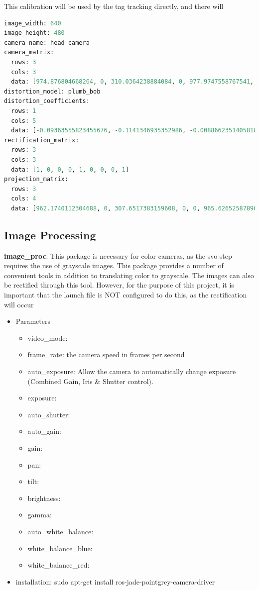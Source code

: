 \begin{itemize}
\begin{enumerate}
This calibration will be used by the tag tracking directly, and there will 
\begin{lstlisting}[language=python] 
image_width: 640
image_height: 480
camera_name: head_camera
camera_matrix:
  rows: 3
  cols: 3
  data: [974.876804668264, 0, 310.0364238884084, 0, 977.9747558767541, 183.9139863795955, 0, 0, 1]
distortion_model: plumb_bob
distortion_coefficients:
  rows: 1
  cols: 5
  data: [-0.09363555823455676, -0.1141346935352986, -0.008866235140581833, -0.0048644735641969, 0]
rectification_matrix:
  rows: 3
  cols: 3
  data: [1, 0, 0, 0, 1, 0, 0, 0, 1]
projection_matrix:
  rows: 3
  cols: 4
  data: [962.1740112304688, 0, 307.6517383159608, 0, 0, 965.6265258789062, 181.2353823390822, 0, 0, 0, 1, 0]
\end{lstlisting}
\end{enumerate}
\end{itemize}

\subsection{Image Processing}
\noindent \textbf{image\_proc}: This package is necessary for color cameras, as the svo step requires the use of grayscale images. This package provides a number of convenient tools in addition to translating color to grayscale. The images can also be rectified through this tool. However, for the purpose of this project, it is important that the launch file is NOT configured to do this, as the rectification will occur

\begin{itemize}
\item Parameters
\begin{itemize}
\item video\_mode:
\item frame\_rate:  the camera speed in frames per second
\item auto\_exposure:  Allow the camera to automatically change exposure (Combined Gain, Iris \& Shutter control).
\item exposure: 
\item auto\_shutter:
\item auto\_gain:
\item gain:
\item pan:
\item tilt:
\item brightness:
\item gamma:
\item auto\_white\_balance:
\item white\_balance\_blue:
\item white\_balance\_red:
\end{itemize}
\item installation: sudo apt-get install ros-jade-pointgrey-camera-driver
\end{itemize}

